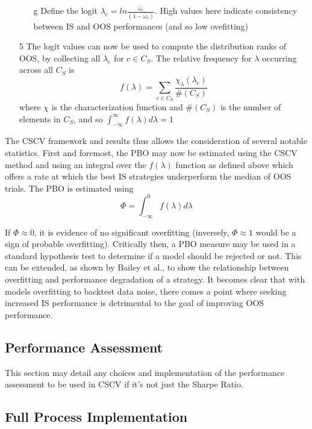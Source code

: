 \documentclass[a4paper,latin]{paper}
\begin{document}
\begin{itemize}
\begin{itemize}
		\item[g] Define the logit $\lambda_c = ln \frac{\bar{\omega}_c}{(1-\bar{\omega}_c)}$. High values here indicate consistency between IS and OOS performances (and so low ovefitting)
	\end{itemize}
	\item [5] The logit values can now be used to compute the distribution ranks of OOS, by collecting all $\lambda_c$ for $c \in C_S$. The relative frequency for $\lambda$ occurring across all $C_S$ is 
	\begin{equation}
	f(\lambda) = \sum_{c \in C_S}\frac{\chi_{\lambda}(\lambda_c)}{\#(C_S)}
	\end{equation}
	where $\chi$ is the characterization function and $\#(C_S)$ is the number of elements in $C_S$, and so $\int_{-\infty}^{\infty} f (\lambda) d \lambda = 1$
\end{itemize}

The CSCV framework and results thus allows the consideration of several notable statistics. First and foremost, 
the PBO may now be estimated using the CSCV method and using an integral over the $f(\lambda)$ function 
as defined above which offers a rate at which the best IS strategies underperform the median of OOS trials. The PBO is estimated using
\begin{equation}
\Phi = \int_{-\infty}^{0} f (\lambda) d \lambda
\end{equation}


If $\Phi \approx 0$,
it is evidence of no significant overfitting (inversely, $\Phi \approx 1$ would be a sign of probable overfitting). Critically then, a PBO measure may be used in a standard hypothesis test to determine if a model should be rejected or not. This 
can be extended, as shown by Bailey et al., to show the relationship between overfitting and performance 
degradation of a strategy. It becomes clear that with models overfitting to backtest data noise, there comes a point 
where seeking increased IS performance is detrimental to the goal of improving OOS performance.  
\hfill \break 

\subsection{Performance Assessment}

This section may detail any choices and implementation of the performance assessment to be used in CSCV if it's not just the Sharpe Ratio. \todo{}

\subsection{Full Process Implementation}\label{imp_fullprocess}
\end{document}
